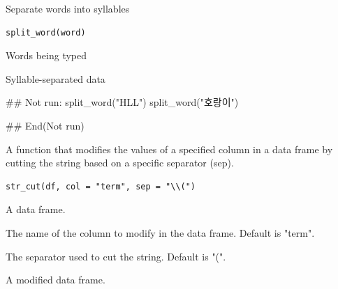 \documentclass[a4paper]{book}
\begin{document}
%
\begin{Description}
Separate words into syllables
\end{Description}
%
\begin{Usage}
\begin{verbatim}
split_word(word)
\end{verbatim}
\end{Usage}
%
\begin{Arguments}
\begin{ldescription}
\item[\code{word}] Words being typed
\end{ldescription}
\end{Arguments}
%
\begin{Value}
Syllable-separated data
\end{Value}
%
\begin{Examples}
\begin{ExampleCode}

\#\# Not run: 
split_word("HLL")
split_word("호랑이")


## End(Not run)

\end{ExampleCode}
\end{Examples}
%
\begin{Description}
A function that modifies the values of a specified column in a data frame by cutting the string based on a specific separator (sep).
\end{Description}
%
\begin{Usage}
\begin{verbatim}
str_cut(df, col = "term", sep = "\\(")
\end{verbatim}
\end{Usage}
%
\begin{Arguments}
\begin{ldescription}
\item[\code{df}] A data frame.

\item[\code{col}] The name of the column to modify in the data frame. Default is "term".

\item[\code{sep}] The separator used to cut the string. Default is "\bsl{}(".
\end{ldescription}
\end{Arguments}
%
\begin{Value}
A modified data frame.
\end{Value}
\end{document}
